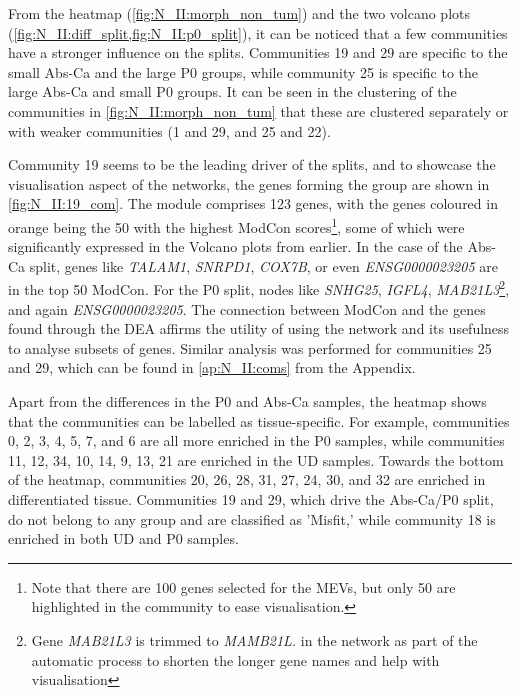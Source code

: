 From the heatmap (\cref{fig:N_II:morph_non_tum}) and the two volcano plots (\cref{fig:N_II:diff_split,fig:N_II:p0_split}), it can be noticed that a few communities have a stronger influence on the splits. Communities 19 and 29 are specific to the small Abs-Ca and the large P0 groups, while community 25 is specific to the large Abs-Ca and small P0 groups. It can be seen in the clustering of the communities in \cref{fig:N_II:morph_non_tum} that these are clustered separately or with weaker communities (1 and 29, and 25 and 22).



Community 19 seems to be the leading driver of the splits, and to showcase the visualisation aspect of the networks, the genes forming the group are shown in \cref{fig:N_II:19_com}. The module comprises 123 genes, with the genes coloured in orange being the 50 with the highest ModCon scores\footnote{Note that there are 100 genes selected for the MEVs, but only 50 are highlighted in the community to ease visualisation.}, some of which were significantly expressed in the Volcano plots from earlier. In the case of the Abs-Ca split, genes like \textit{TALAM1}, \textit{SNRPD1}, \textit{COX7B}, or even \textit{ENSG0000023205} are in the top 50 ModCon. For the P0 split, nodes like \textit{SNHG25}, \textit{IGFL4}, \textit{MAB21L3}\footnote{Gene \textit{MAB21L3} is trimmed to \textit{MAMB21L.} in the network as part of the automatic process to shorten the longer gene names and help with visualisation}, and again \textit{ENSG0000023205}. The connection between ModCon and the genes found through the DEA affirms the utility of using the network and its usefulness to analyse subsets of genes. Similar analysis was performed for communities 25 and 29, which can be found in \cref{ap:N_II:coms} from the Appendix.



Apart from the differences in the P0 and Abs-Ca samples, the heatmap shows that the communities can be labelled as tissue-specific. For example, communities 0, 2, 3, 4, 5, 7, and 6 are all more enriched in the P0 samples, while communities 11, 12, 34, 10, 14, 9, 13, 21 are enriched in the UD samples. Towards the bottom of the heatmap, communities 20, 26, 28, 31, 27, 24, 30, and 32 are enriched in differentiated tissue. Communities 19 and 29, which drive the Abs-Ca/P0 split, do not belong to any group and are classified as 'Misfit,' while community 18 is enriched in both UD and P0 samples.


